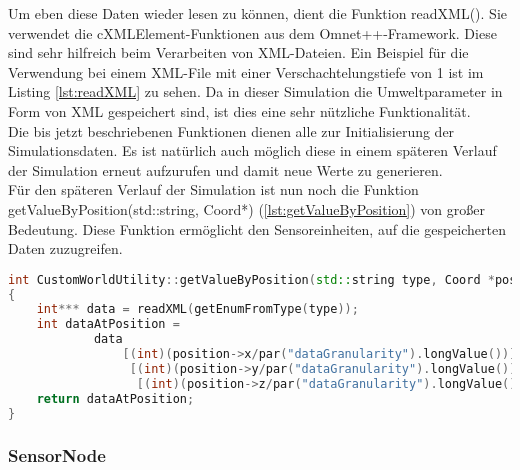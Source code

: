 Um eben diese Daten wieder lesen zu können, dient die Funktion readXML(). Sie verwendet die cXMLElement-Funktionen aus dem Omnet++-Framework. Diese sind sehr hilfreich beim Verarbeiten von XML-Dateien. Ein Beispiel für die Verwendung bei einem XML-File mit einer Verschachtelungstiefe von 1 ist im Listing \ref{lst:readXML} zu sehen. Da in dieser Simulation die Umweltparameter in Form von XML gespeichert sind, ist dies eine sehr nützliche Funktionalität.\\
Die bis jetzt beschriebenen Funktionen dienen alle zur Initialisierung der Simulationsdaten. Es ist natürlich auch möglich diese in einem späteren Verlauf der Simulation erneut aufzurufen und damit neue Werte zu generieren. \\
Für den späteren Verlauf der Simulation ist nun noch die Funktion getValueByPosition(std::string, Coord*) (\ref{lst:getValueByPosition}) von großer Bedeutung. Diese Funktion ermöglicht den Sensoreinheiten, auf die gespeicherten Daten zuzugreifen.

\begin{lstlisting}[language=C++, label=lst:getValueByPosition, caption=getValueByPosition()]
int CustomWorldUtility::getValueByPosition(std::string type, Coord *position)
{
    int*** data = readXML(getEnumFromType(type));
    int dataAtPosition =
            data
                [(int)(position->x/par("dataGranularity").longValue())]
                 [(int)(position->y/par("dataGranularity").longValue())]
                  [(int)(position->z/par("dataGranularity").longValue())];
    return dataAtPosition;
}
\end{lstlisting}

\newpage
\subsubsection{SensorNode}

